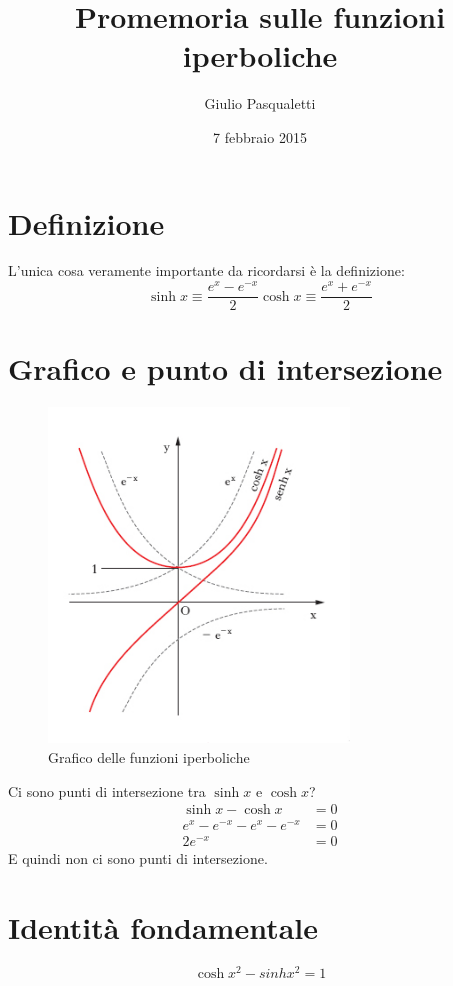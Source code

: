 \documentclass[10pt,a4paper]{article}
\title{Promemoria sulle funzioni iperboliche}
\author{Giulio Pasqualetti}
\date{7 febbraio 2015}
\begin{document}
\maketitle

\section{Definizione}

L'unica cosa veramente importante da ricordarsi è la definizione:
\begin{equation}
  \label{eq:definizione}
  \sinh{x} \equiv \frac{e^x-e^{-x}}{2}
  \cosh{x} \equiv \frac{e^x+e^{-x}}{2}
\end{equation}

\section{Grafico e punto di intersezione}

\begin{figure}
  \centering
  \includegraphics[width=8cm]{./funzioni_iperboliche.jpg}
  \caption{Grafico delle funzioni iperboliche}
  \label{fig:grap}
\end{figure}
Ci sono punti di intersezione tra $\sinh{x}$ e $\cosh{x}$?
\begin{align*}
  \sinh{x} - \cosh{x} &= 0\\
  e^{x}-e^{-x} - e^{x} - e^{-x} &= 0 \\
  2 e^{-x} &= 0
\end{align*}
E quindi non ci sono punti di intersezione.  

\section{Identità fondamentale}
\begin{equation}
  \label{eq:identita}
  \cosh{x}^2 - sinh{x}^2 = 1
\end{equation}
\end{document}
